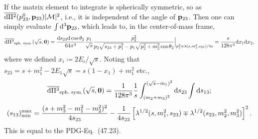 \documentclass[CheatSheet]{subfiles}
\begin{document}
If the matrix element to integrate is spherically symmetric, so as $\overline{{\mathrm{d}}\Pi^2}(p^0_{23}, {\mathbf{p}}_{23})|\mathcal M|^2$, i.e., it is independent of the angle of ${\mathbf{p}}_{23}$. Then one can simply evaluate  $\int{\mathrm{d}}^3{\mathbf{p}}_{23}$, which leads to, in the center-of-mass frame,
\begin{equation}
\overline{{\mathrm{d}}\Pi^3}_{\text{sph.\ sym.}}(\sqrt{s}, {\mathbf{0}})
=
\frac{{\mathrm{d}} s_{23}{\mathrm{d}}\cos\theta_{2}}{64\pi^3}
\frac{p_1}{\sqrt s}
\frac{p_{2}^2}{p_2\sqrt{s_{23}+p_1^2} - p_1\sqrt{p_2^2+m_2^2}\cos\theta_2}\Big|_{
 p_1^2=\lambda(s,m_1^2,s_{23})/4s
}
= \frac{s}{128\pi^3}{\mathrm{d}} x_1{\mathrm{d}} x_2,
\end{equation}
where we defined $x_i\coloneq {2E_i}/{\sqrt s}$. Noting that $s_{23}=s+m_1^2-2E_1\sqrt{s}=s(1-x_1)+m_1^2$ etc., 
\begin{equation}
 \overline{\dd\Pi^3}_{\text{sph.\ sym.}}(\sqrt{s}, \vc 0)
=
\frac{1}{128\pi^3}\frac{1}{s}
\int_{(m_2+m_3)^2}^{(\sqrt{s}-m_1)^2}\dd s_{23}\int\dd s_{13};
\end{equation}
\begin{equation}
 (s_{13})^{\text{max}}_{\text{min}} =
\frac{(s+m_3^2-m_1^2-m_2^2)^2}{4s_{23}}
-\frac{1}{4s_{23}}
\left[\Kallen[1/2](s,m_1^2,s_{23})\mp\Kallen[1/2](s_{23},m_2^2,m_3^2)\right]^2.
\end{equation}
This is equal to the PDG-Eq.~(47.23)\cite{PDG2018}.
\end{document}
